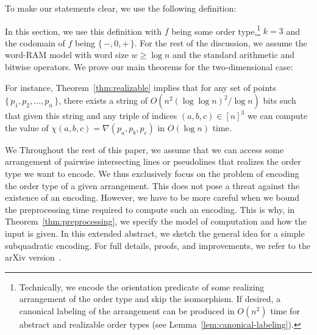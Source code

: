 \ifeurocg\else
To make our statements clear, we use the following definition:
%

%
In this section, we use this definition with \(f\) being some order
type,\footnote{%
  Technically, we encode the orientation predicate of some realizing
  arrangement of the order type and skip the isomorphism. If desired, a
  canonical labeling of the arrangement can be produced in \(O(n^2)\) time for
  abstract and realizable order types (see Lemma~\ref{lem:canonical-labeling}).
}
\(k=3\) and the codomain of \(f\) being \(\{\, -,0,+\,\}\). For the rest of the
discussion, we assume the word-RAM model with word size \(w \geq \log n\) and
the standard arithmetic and bitwise operators.
%
We prove our main theorems for the two-dimensional case:
%



%
For instance, Theorem~\ref{thm:realizable} implies that for any set of points
\(\{\, p_1, p_2, \ldots, p_n\,\}\), there exists a string of \(O(n^2 {(\log
\log n)}^2 / \log n)\) bits such that given this string and any triple of
indices \((a,b,c) \in {[n]}^3\) we can compute the value of \(\chi(a,b,c) =
\nabla(p_a, p_b, p_c)\) in \(O(\log n)\) time.
\fi

\ifeurocg
We \else
Throughout the rest of this paper, we \fi
assume that we can access some arrangement of pairwise intersecting lines or
pseudolines that realizes the order type we want to encode. We thus exclusively
focus on the problem of encoding the order type of a given arrangement. This
does not pose a threat against the existence of an encoding.
\ifeurocg\else%
However, we have to be more careful when we bound the preprocessing
time required to compute such an encoding. This is why, in
Theorem~\ref{thm:preprocessing}, we specify the model of computation and how
the input is given.
\fi%
\ifeurocg%
In this extended abstract, we sketch the general idea for a simple subquadratic
encoding. For full details, proofs, and improvements, we refer to the arXiv
version~\cite{CCILO18}.
\fi%
